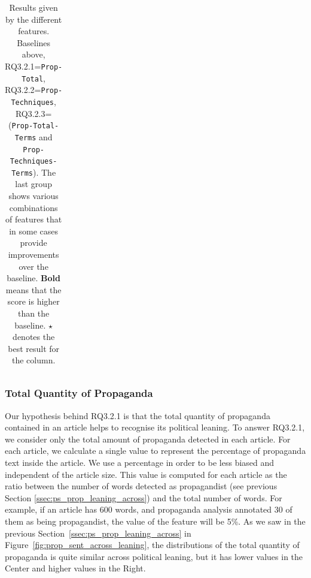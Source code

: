 \begin{table}[!htbp]
\begin{tabular}{l|rr|rr}
    \end{tabular}
    \caption{Results given by the different features. Baselines above, RQ3.2.1=\texttt{Prop-Total}, RQ3.2.2=\texttt{Prop-Techniques}, RQ3.2.3= (\texttt{Prop-Total-Terms} and \texttt{Prop-Techniques-Terms}). The last group shows various combinations of features that in some cases provide improvements over the baseline. \textbf{Bold} means that the score is higher than the baseline. $\star$ denotes the best result for the column.}
    \label{tab:results_prop_features_classifier}
\end{table}

\subsubsection{Total Quantity of Propaganda}


Our hypothesis behind RQ3.2.1 is that the total quantity of propaganda contained in an article helps to recognise its political leaning. 
To answer RQ3.2.1, we consider only the total amount of propaganda detected in each article. For each article, we calculate a single value to represent the percentage of propaganda text inside the article. %
We use a percentage in order to be less biased and independent of the article size.
This value is computed for each article as the ratio between the number of words detected as propagandist (see previous Section \ref{ssec:ps_prop_leaning_across}) and the total number of words. For example, if an article has 600 words, and propaganda analysis annotated 30 of them as being propagandist, the value of the feature will be 5\%.  
As we saw in the previous Section~\ref{ssec:ps_prop_leaning_across} in Figure~\ref{fig:prop_sent_across_leaning}, the distributions of the total quantity of propaganda is quite similar across political leaning, but it has lower values in the Center and higher values in the Right.

